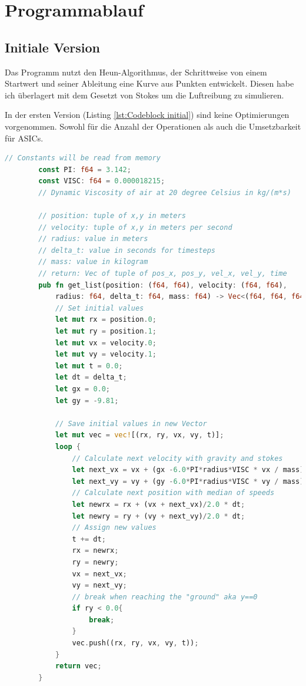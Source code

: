 \documentclass{artilcle}
\begin{document}
    \section{Programmablauf}

    \subsection{Initiale Version}

    Das Programm nutzt den Heun-Algorithmus, der Schrittweise von einem Startwert und seiner Ableitung eine Kurve aus
    Punkten entwickelt.
    Diesen habe ich überlagert mit dem Gesetzt von Stokes um die Luftreibung zu simulieren.

    \newblock

    In der ersten Version (Listing \ref{lst:Codeblock initial}) sind keine Optimierungen vorgenommen. Sowohl für die Anzahl
    der Operationen als auch die Umsetzbarkeit für ASICs.

    \newpage

    \begin{lstlisting}[language=Rust, caption={Initialer Code.}, label=lst:Codeblock initial]
        // Constants will be read from memory
        const PI: f64 = 3.142;
        const VISC: f64 = 0.000018215;
        // Dynamic Viscosity of air at 20 degree Celsius in kg/(m*s)

        // position: tuple of x,y in meters
        // velocity: tuple of x,y in meters per second
        // radius: value in meters
        // delta_t: value in seconds for timesteps
        // mass: value in kilogram
        // return: Vec of tuple of pos_x, pos_y, vel_x, vel_y, time
        pub fn get_list(position: (f64, f64), velocity: (f64, f64),
            radius: f64, delta_t: f64, mass: f64) -> Vec<(f64, f64, f64, f64, f64)>{
            // Set initial values
            let mut rx = position.0;
            let mut ry = position.1;
            let mut vx = velocity.0;
            let mut vy = velocity.1;
            let mut t = 0.0;
            let dt = delta_t;
            let gx = 0.0;
            let gy = -9.81;

            // Save initial values in new Vector
            let mut vec = vec![(rx, ry, vx, vy, t)];
            loop {
                // Calculate next velocity with gravity and stokes
                let next_vx = vx + (gx -6.0*PI*radius*VISC * vx / mass)*dt;
                let next_vy = vy + (gy -6.0*PI*radius*VISC * vy / mass)*dt;
                // Calculate next position with median of speeds
                let newrx = rx + (vx + next_vx)/2.0 * dt;
                let newry = ry + (vy + next_vy)/2.0 * dt;
                // Assign new values
                t += dt;
                rx = newrx;
                ry = newry;
                vx = next_vx;
                vy = next_vy;
                // break when reaching the "ground" aka y==0
                if ry < 0.0{
                    break;
                }
                vec.push((rx, ry, vx, vy, t));
            }
            return vec;
        }
    \end{lstlisting}
\end{document}
